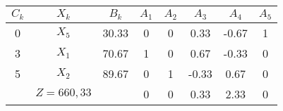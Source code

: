     \begin{tabular}{cccccccc}
    \hline
    \hline
    $C_k$   & $X_k$   & $B_k$   & $A_1$   & $A_2$   & $A_3$   & $A_4$   & $A_5$ \bigstrut\\
    \hline
    0       & $X_5$   & 30.33   & 0       & 0       & 0.33    & -0.67   & 1 \bigstrut[t]\\
    3       & $X_1$   & 70.67   & 1       & 0       & 0.67    & -0.33   & 0 \\
    5       & $X_2$   & 89.67   & 0       & 1       & -0.33   & 0.67    & 0 \bigstrut[b]\\
    \hline
            & $Z=660,33$ &         & 0       & 0       & 0.33    & 2.33    & 0 \bigstrut\\
    \hline
    \hline
    \end{tabular}%
